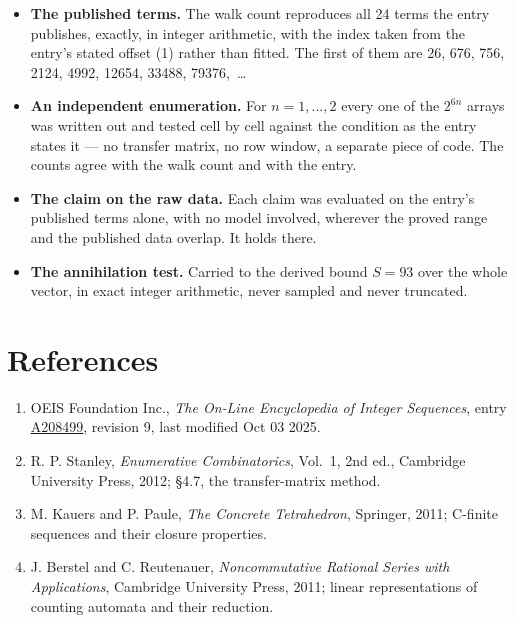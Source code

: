 \documentclass[11pt]{article}
\theoremstyle{definition}
\begin{document}
\begin{itemize}

\item {\bfseries The published terms.} The walk count reproduces all 24 terms the entry publishes, exactly, in integer arithmetic, with the index taken from the entry's stated offset (1) rather than fitted. The first of them are 26, 676, 756, 2124, 4992, 12654, 33488, 79376,~\dots

\item {\bfseries An independent enumeration.} For $n = 1,\dots,2$ every one of the $2^{6n}$ arrays was written out and tested cell by cell against the condition as the entry states it --- no transfer matrix, no row window, a separate piece of code. The counts agree with the walk count and with the entry.

\item {\bfseries The claim on the raw data.} Each claim was evaluated on the entry's published terms alone, with no model involved, wherever the proved range and the published data overlap. It holds there.

\item {\bfseries The annihilation test.} Carried to the derived bound $S = 93$ over the whole vector, in exact integer arithmetic, never sampled and never truncated.

\end{itemize}

\section{References}

\begin{enumerate}

\item OEIS Foundation Inc., \emph{The On-Line Encyclopedia of Integer Sequences}, entry \href{https://oeis.org/A208499}{A208499}, revision 9, last modified Oct 03 2025.

\item R. P. Stanley, \emph{Enumerative Combinatorics}, Vol.~1, 2nd ed., Cambridge University Press, 2012; \S4.7, the transfer-matrix method.

\item M. Kauers and P. Paule, \emph{The Concrete Tetrahedron}, Springer, 2011; C-finite sequences and their closure properties.

\item J. Berstel and C. Reutenauer, \emph{Noncommutative Rational Series with Applications}, Cambridge University Press, 2011; linear representations of counting automata and their reduction.

\end{enumerate}
\end{document}
